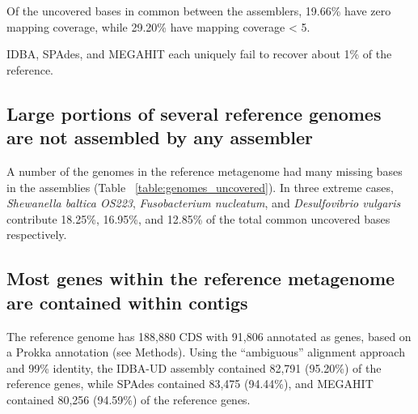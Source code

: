\documentclass[10pt,a4paper,twocolumn]{article}
\begin{document}

Of the uncovered bases in common between the assemblers, 19.66\% have
zero mapping coverage, while 29.20\% have mapping coverage \textless
5.


IDBA, SPAdes, and MEGAHIT each uniquely fail to recover about
1\% of the reference.

\subsection*{Large portions of several reference genomes are not assembled by any assembler}

A number of the genomes in the reference metagenome had many missing
bases in the assemblies (Table ~\ref{table:genomes_uncovered}). In
three extreme cases, {\em Shewanella baltica OS223}, {\em Fusobacterium
nucleatum}, and {\em Desulfovibrio vulgaris} contribute 18.25\%, 16.95\%, and 12.85\%
of the total common uncovered bases respectively.



\subsection*{Most genes within the reference metagenome are contained within contigs}

The reference genome has 188,880 CDS with 91,806 annotated as genes,
based on a Prokka annotation (see Methods).
Using the ``ambiguous'' alignment approach and 99\% identity, the
IDBA-UD assembly contained 82,791 (95.20\%) of the reference genes,
while SPAdes contained 83,475 (94.44\%), and
MEGAHIT contained 80,256 (94.59\%) of the reference genes.
\end{document}
